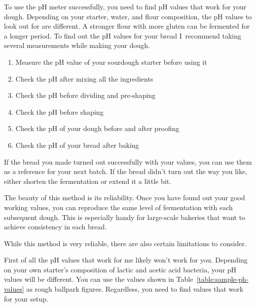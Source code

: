 To use the pH meter successfully, you need to find pH values
that work for your dough. Depending on your starter,
water, and flour composition, the pH values to look out
for are different. A stronger flour with more gluten
can be fermented for a longer period. To find out
the pH values for your bread I~recommend taking
several measurements while making your dough.

\begin{enumerate}
  \item Measure the pH value of your sourdough starter before using it
  \item Check the pH after mixing all the ingredients
  \item Check the pH before dividing and pre-shaping
  \item Check the pH before shaping
  \item Check the pH of your dough before and after proofing
  \item Check the pH of your bread after baking
\end{enumerate}

If the bread you made turned out successfully with your values,
you can use them as a reference for your next batch. If the
bread didn't turn out the way you like, either shorten
the fermentation or extend it a little bit.

\begin{table}[!htb]
    \centering
        \caption[Dough's pH during bread preparation]{Example pH values for
            the different breakpoints of my own sourdough process.}%
        \label{table:sample-ph-values}
\end{table}

The beauty of this method is its reliability. Once you have found
out your good working values, you can reproduce
the same level of fermentation with each subsequent dough.
This is especially handy for large-scale bakeries that want
to achieve consistency in each bread.

While this method is very reliable, there are also certain
limitations to consider.

First of all the pH values that work for me likely won't work for
you. Depending on your own starter's composition of lactic
and acetic acid bacteria, your pH values will be different.
You can use the values shown in Table~\ref{table:sample-ph-values}
as rough ballpark figures. Regardless, you need to find values
that work for your setup.

